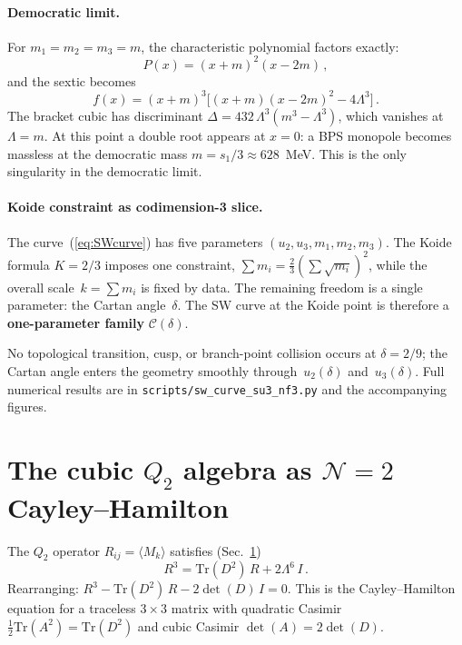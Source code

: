 \documentclass[12pt,a4paper]{article}
\begin{document}
\paragraph{Democratic limit.}
For $m_1 = m_2 = m_3 = m$, the characteristic polynomial
factors exactly:
\begin{equation}
  P(x) = (x+m)^2(x - 2m)\,,
\end{equation}
and the sextic becomes
\begin{equation}
  f(x) = (x+m)^3\bigl[(x+m)(x-2m)^2 - 4\Lambda^3\bigr]\,.
  \label{eq:democratic_sextic}
\end{equation}
The bracket cubic has discriminant
$\Delta = 432\,\Lambda^3(m^3 - \Lambda^3)$,
which vanishes at $\Lambda = m$.
At this point a double root appears at $x = 0$:
a BPS monopole becomes massless at the democratic mass
$m = s_1/3 \approx 628$~MeV.
This is the only singularity in the democratic limit.

\paragraph{Koide constraint as codimension-3 slice.}
The curve~(\ref{eq:SWcurve}) has five parameters
$(u_2, u_3, m_1, m_2, m_3)$.
The Koide formula $K = 2/3$ imposes one constraint,
$\sum m_i = \frac{2}{3}(\sum\sqrt{m_i})^2$,
while the overall scale~$k = \sum m_i$ is fixed by data.
The remaining freedom is a single parameter: the Cartan
angle~$\delta$.
The SW curve at the Koide point is therefore a
\textbf{one-parameter family} $\mathcal{C}(\delta)$.

No topological transition, cusp, or branch-point collision
occurs at $\delta = 2/9$; the Cartan angle enters the geometry
smoothly through~$u_2(\delta)$ and~$u_3(\delta)$.
Full numerical results are in \texttt{scripts/sw\_curve\_su3\_nf3.py}
and the accompanying figures.

\section{The cubic $Q_2$ algebra as $\mathcal{N}{=}2$
         Cayley--Hamilton}
\label{app:cubic}

The $Q_2$ operator $R_{ij} = \langle M_k\rangle$ satisfies (Sec.~\ref{app:cubic})
\begin{equation}
  R^3 = \mathrm{Tr}(D^2)\,R + 2\Lambda^6\,I\,.
  \label{eq:cubic_Q2_app}
\end{equation}
Rearranging: $R^3 - \mathrm{Tr}(D^2)\,R - 2\det(D)\,I = 0$.
This is the Cayley--Hamilton equation for a traceless $3\times 3$
matrix with quadratic Casimir $\frac{1}{2}\mathrm{Tr}(A^2) =
\mathrm{Tr}(D^2)$ and cubic Casimir $\det(A) = 2\det(D)$.
\end{document}

